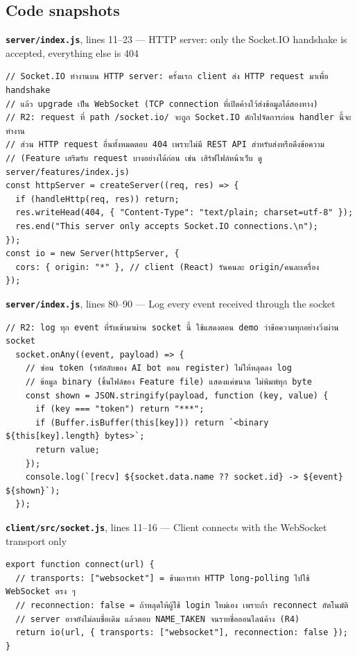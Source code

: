 \documentclass[11pt,a4paper]{article}
\newcommand{\code}[1]{\texttt{#1}}
\newcommand{\snap}[3]{\par\medskip\textbf{\code{#1}}, lines #2 --- #3}
\begin{document}
\subsection*{Code snapshots}
\snap{server/index.js}{11--23}{HTTP server: only the Socket.IO handshake is accepted, everything else is 404}
\begin{Verbatim}[firstnumber=11]
// Socket.IO ทำงานบน HTTP server: ครั้งแรก client ส่ง HTTP request มาเพื่อ handshake
// แล้ว upgrade เป็น WebSocket (TCP connection ที่เปิดค้างไว้ส่งข้อมูลได้สองทาง)
// R2: request ที่ path /socket.io/ จะถูก Socket.IO ดักไปจัดการก่อน handler นี้จะทำงาน
// ส่วน HTTP request อื่นทั้งหมดตอบ 404 เพราะไม่มี REST API สำหรับส่งหรือดึงข้อความ
// (Feature เสริมรับ request บางอย่างได้ก่อน เช่น เสิร์ฟไฟล์หน้าเว็บ ดู server/features/index.js)
const httpServer = createServer((req, res) => {
  if (handleHttp(req, res)) return;
  res.writeHead(404, { "Content-Type": "text/plain; charset=utf-8" });
  res.end("This server only accepts Socket.IO connections.\n");
});
const io = new Server(httpServer, {
  cors: { origin: "*" }, // client (React) รันคนละ origin/คนละเครื่อง
});
\end{Verbatim}

\snap{server/index.js}{80--90}{Log every event received through the socket}
\begin{Verbatim}[firstnumber=80]
  // R2: log ทุก event ที่รับเข้ามาผ่าน socket นี้ ใช้แสดงตอน demo ว่าข้อความทุกอย่างวิ่งผ่าน socket
  socket.onAny((event, payload) => {
    // ซ่อน token (รหัสลับของ AI bot ตอน register) ไม่ให้หลุดลง log
    // ข้อมูล binary (ชิ้นไฟล์ของ Feature file) แสดงแค่ขนาด ไม่พิมพ์ทุก byte
    const shown = JSON.stringify(payload, function (key, value) {
      if (key === "token") return "***";
      if (Buffer.isBuffer(this[key])) return `<binary ${this[key].length} bytes>`;
      return value;
    });
    console.log(`[recv] ${socket.data.name ?? socket.id} -> ${event} ${shown}`);
  });
\end{Verbatim}

\snap{client/src/socket.js}{11--16}{Client connects with the WebSocket transport only}
\begin{Verbatim}[firstnumber=11]
export function connect(url) {
  // transports: ["websocket"] = ข้ามการทำ HTTP long-polling ไปใช้ WebSocket ตรง ๆ
  // reconnection: false = ถ้าหลุดให้ผู้ใช้ login ใหม่เอง เพราะถ้า reconnect อัตโนมัติ
  // server อาจยังไม่ลบชื่อเดิม แล้วตอบ NAME_TAKEN จนรายชื่อออนไลน์ค้าง (R4)
  return io(url, { transports: ["websocket"], reconnection: false });
}
\end{Verbatim}
\end{document}
